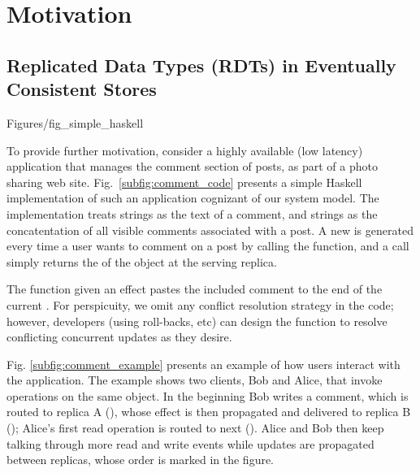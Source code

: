 \section{Motivation}
\label {sec:motiv}
%
\subsection{Replicated Data Types (RDTs) in Eventually Consistent Stores}
 {Figures/fig_simple_haskell}

To provide further motivation, consider a highly available (low
latency) application that manages the comment section of posts, as
part of a photo sharing web site.  Fig.~\ref{subfig:comment_code}
presents a simple Haskell implementation of such an application
cognizant of our system model.  The implementation treats
\effectC{} strings as the text of a comment, and 
\stateC{} strings as the concatentation of all visible comments associated
with a post.  A new \effectC{} is generated every time a user wants to
comment on a post by calling the \writeC{} function, and a \readC{}
call simply returns the \stateC{} of the object at the serving
replica.

The \applyC{} function given an effect pastes the included comment to
the end of the current \stateC{}.  For perspicuity, we omit any
conflict resolution strategy in the code; however, developers (using
roll-backs, etc) can design the \applyC{} function to resolve
conflicting concurrent updates as they desire.

Fig. \ref{subfig:comment_example} presents an example of how users
interact with the application. The example shows two clients, Bob and
Alice, that invoke operations on the same object. In the beginning Bob
writes a comment, which is routed to replica A (), whose
effect is then propagated and delivered to replica B ();
Alice's first read operation is routed to next (). Alice and
Bob then keep talking through more read and write events while updates
are propagated between replicas, whose order is marked in the figure.

